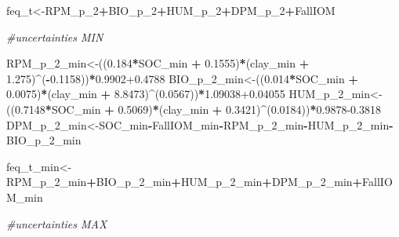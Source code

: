 \documentclass[
  10pt,
  b5paper,
]{book}
\newenvironment{Shaded}{\begin{snugshade}}{\end{snugshade}}
\newcommand{\CommentTok}[1]{\textcolor[rgb]{0.56,0.35,0.01}{\textit{#1}}}
\newcommand{\DecValTok}[1]{\textcolor[rgb]{0.00,0.00,0.81}{#1}}
\newcommand{\FloatTok}[1]{\textcolor[rgb]{0.00,0.00,0.81}{#1}}
\newcommand{\NormalTok}[1]{#1}
\newcommand{\OperatorTok}[1]{\textcolor[rgb]{0.81,0.36,0.00}{\textbf{#1}}}
\newcommand{\StringTok}[1]{\textcolor[rgb]{0.31,0.60,0.02}{#1}}
\begin{document}
\begin{Shaded}
\begin{Highlighting}[]
{\NormalTok{feq_t<-RPM_p_}\DecValTok{2}\OperatorTok{+}\NormalTok{BIO_p_}\DecValTok{2}\OperatorTok{+}\NormalTok{HUM_p_}\DecValTok{2}\OperatorTok{+}\NormalTok{DPM_p_}\DecValTok{2}\OperatorTok{+}\NormalTok{FallIOM}

\CommentTok{#uncertainties  MIN}

\NormalTok{RPM_p_}\DecValTok{2}\NormalTok{_min<-((}\FloatTok{0.184}\OperatorTok{*}\NormalTok{SOC_min }\OperatorTok{+}\StringTok{ }\FloatTok{0.1555}\NormalTok{)}\OperatorTok{*}\NormalTok{(clay_min }\OperatorTok{+}\StringTok{ }\FloatTok{1.275}\NormalTok{)}\OperatorTok{^}\NormalTok{(}\OperatorTok{-}\FloatTok{0.1158}\NormalTok{))}\OperatorTok{*}\FloatTok{0.9902+0.4788}
\NormalTok{BIO_p_}\DecValTok{2}\NormalTok{_min<-((}\FloatTok{0.014}\OperatorTok{*}\NormalTok{SOC_min }\OperatorTok{+}\StringTok{ }\FloatTok{0.0075}\NormalTok{)}\OperatorTok{*}\NormalTok{(clay_min }\OperatorTok{+}\StringTok{ }\FloatTok{8.8473}\NormalTok{)}\OperatorTok{^}\NormalTok{(}\FloatTok{0.0567}\NormalTok{))}\OperatorTok{*}\FloatTok{1.09038+0.04055}
\NormalTok{HUM_p_}\DecValTok{2}\NormalTok{_min<-((}\FloatTok{0.7148}\OperatorTok{*}\NormalTok{SOC_min }\OperatorTok{+}\StringTok{ }\FloatTok{0.5069}\NormalTok{)}\OperatorTok{*}\NormalTok{(clay_min }\OperatorTok{+}\StringTok{ }\FloatTok{0.3421}\NormalTok{)}\OperatorTok{^}\NormalTok{(}\FloatTok{0.0184}\NormalTok{))}\OperatorTok{*}\FloatTok{0.9878-0.3818}
\NormalTok{DPM_p_}\DecValTok{2}\NormalTok{_min<-SOC_min}\OperatorTok{-}\NormalTok{FallIOM_min}\OperatorTok{-}\NormalTok{RPM_p_}\DecValTok{2}\NormalTok{_min}\OperatorTok{-}\NormalTok{HUM_p_}\DecValTok{2}\NormalTok{_min}\OperatorTok{-}\NormalTok{BIO_p_}\DecValTok{2}\NormalTok{_min}

\NormalTok{feq_t_min<-RPM_p_}\DecValTok{2}\NormalTok{_min}\OperatorTok{+}\NormalTok{BIO_p_}\DecValTok{2}\NormalTok{_min}\OperatorTok{+}\NormalTok{HUM_p_}\DecValTok{2}\NormalTok{_min}\OperatorTok{+}\NormalTok{DPM_p_}\DecValTok{2}\NormalTok{_min}\OperatorTok{+}\NormalTok{FallIOM_min}

\CommentTok{#uncertainties  MAX}

}
\end{Highlighting}
\end{Shaded}
\end{document}
